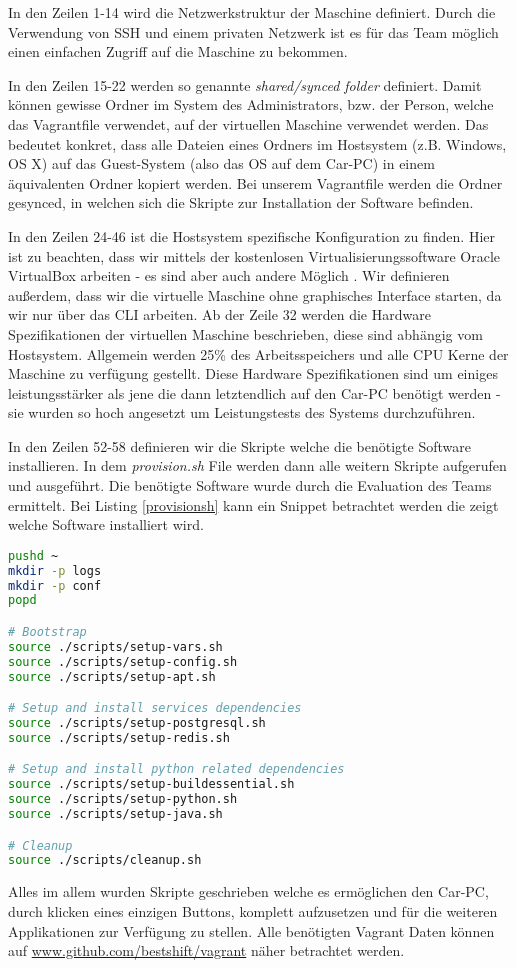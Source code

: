 In den Zeilen 1-14 wird die Netzwerkstruktur der Maschine definiert. Durch die Verwendung von SSH \cite{MELD.CH3-ssh.website} und einem privaten Netzwerk ist es für das Team möglich einen einfachen Zugriff auf die Maschine zu bekommen.

In den Zeilen 15-22 werden so genannte \textit{shared/synced folder} \cite{MELD.CH3-vagrant.syncedFolders} definiert. Damit können gewisse Ordner im System des Administrators, bzw. der Person, welche das Vagrantfile verwendet, auf der virtuellen Maschine verwendet werden. Das bedeutet konkret, dass alle Dateien eines Ordners im Hostsystem (z.B. Windows, OS X) auf das Guest-System (also das OS auf dem Car-PC) in einem äquivalenten Ordner kopiert werden. Bei unserem Vagrantfile werden die Ordner gesynced, in welchen sich die Skripte zur Installation der Software befinden.

In den Zeilen 24-46 ist die Hostsystem spezifische Konfiguration zu finden. Hier ist zu beachten, dass wir mittels der kostenlosen Virtualisierungssoftware Oracle VirtualBox \cite{MELD.CH3-virtualbox.website} arbeiten - es sind aber auch andere Möglich \cite{MELD.CH3-vagrant.providers}. Wir definieren außerdem, dass wir die virtuelle Maschine ohne graphisches Interface starten, da wir nur über das CLI arbeiten. Ab der Zeile 32 werden die Hardware Spezifikationen der virtuellen Maschine beschrieben, diese sind abhängig vom Hostsystem. Allgemein werden 25\% des Arbeitsspeichers und alle CPU Kerne der Maschine zu verfügung gestellt. Diese Hardware Spezifikationen sind um einiges leistungsstärker als jene die dann letztendlich auf den Car-PC benötigt werden - sie wurden so hoch angesetzt um Leistungstests des Systems durchzuführen.

In den Zeilen 52-58 definieren wir die Skripte welche die benötigte Software installieren. In dem \textit{provision.sh} File werden dann alle weitern Skripte aufgerufen und ausgeführt. Die benötigte Software wurde durch die Evaluation des Teams ermittelt. Bei Listing \ref{provisionsh} kann ein Snippet betrachtet werden die zeigt welche Software installiert wird.

\begin{lstlisting}[language=bash, caption=provision.sh,label={provisionsh}]
pushd ~
mkdir -p logs
mkdir -p conf
popd

# Bootstrap
source ./scripts/setup-vars.sh
source ./scripts/setup-config.sh
source ./scripts/setup-apt.sh

# Setup and install services dependencies
source ./scripts/setup-postgresql.sh
source ./scripts/setup-redis.sh

# Setup and install python related dependencies
source ./scripts/setup-buildessential.sh
source ./scripts/setup-python.sh
source ./scripts/setup-java.sh

# Cleanup
source ./scripts/cleanup.sh
\end{lstlisting}

Alles im allem wurden Skripte geschrieben welche es ermöglichen den Car-PC, durch klicken eines einzigen Buttons, komplett aufzusetzen und für die weiteren Applikationen zur Verfügung zu stellen. Alle benötigten Vagrant Daten können auf \url{www.github.com/bestshift/vagrant} näher betrachtet werden.